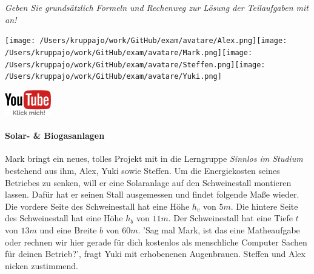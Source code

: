 \documentclass[a4paper, 9pt]{scrartcl}\usepackage[]{graphicx}\usepackage[]{xcolor}
\begin{document}
\textit{Geben Sie grundsätzlich Formeln und Rechenweg zur Lösung der Teilaufgaben mit an!} \\[1Ex]
 

 
\ifcollection
\begin{flushright}
\tiny\vspace{-3Ex}
\textbf{\examinhaltstart}
\exammodulemathstat
\vspace{-4Ex}
\end{flushright}
\begin{minipage}[t]{0.5\textwidth}
\texttt{[image: /Users/kruppajo/work/GitHub/exam/avatare/Alex.png]}\hspace{-4mm}\texttt{[image: /Users/kruppajo/work/GitHub/exam/avatare/Mark.png]}\hspace{-4mm}\texttt{[image: /Users/kruppajo/work/GitHub/exam/avatare/Steffen.png]}\hspace{-4mm}\texttt{[image: /Users/kruppajo/work/GitHub/exam/avatare/Yuki.png]}
\end{minipage}
\begin{minipage}[t]{0.5\textwidth}
\hfill
\href{https://youtu.be/aBxLkdF-c4M}{\includegraphics[width = 2cm]{img/youtube}}
\end{minipage}
\fi




\ifcollection
\paragraph{Solar- \& Biogasanlagen}
\fi



Mark bringt ein neues, tolles Projekt mit in die Lerngruppe \textit{Sinnlos im Studium} bestehend aus ihm, Alex, Yuki sowie Steffen. Um die Energiekosten seines Betriebes zu senken, will er eine Solaranlage auf den Schweinestall montieren lassen. Dafür hat er seinen Stall ausgemessen und findet folgende Maße wieder. Die vordere Seite des Schweinestall hat eine Höhe $h_v$ von $5m$. Die hintere Seite des Schweinestall hat eine Höhe $h_b$ von $11m$. Der Schweinestall hat eine Tiefe $t$ von $13m$ und eine Breite $b$ von $60m$. 'Sag mal Mark, ist das eine Matheaufgabe oder rechnen wir hier gerade für dich kostenlos als menschliche Computer Sachen für deinen Betrieb?', fragt Yuki mit erhobenenen Augenbrauen. Steffen und Alex nicken zustimmend.
\end{document}
